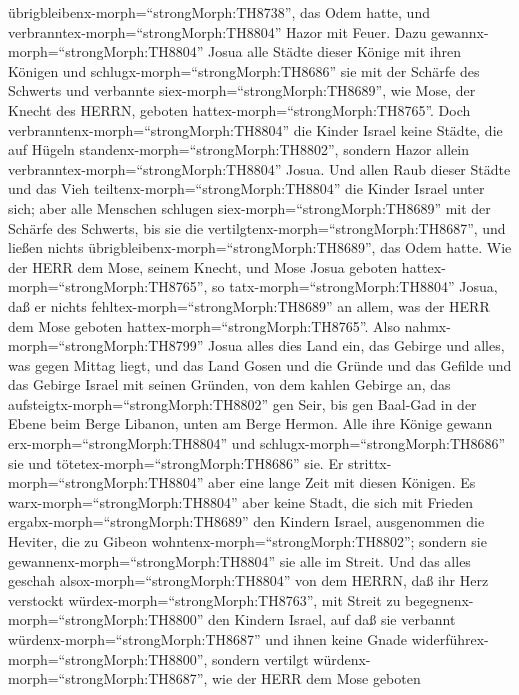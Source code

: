 übrigbleibenx-morph=``strongMorph:TH8738'', das Odem hatte, und
verbranntex-morph=``strongMorph:TH8804'' Hazor mit Feuer. 
Dazu gewannx-morph=``strongMorph:TH8804'' Josua alle Städte dieser
Könige mit ihren Königen und schlugx-morph=``strongMorph:TH8686'' sie
mit der Schärfe des Schwerts und verbannte
siex-morph=``strongMorph:TH8689'', wie Mose, der Knecht des HERRN,
geboten hattex-morph=``strongMorph:TH8765''.  Doch
verbranntenx-morph=``strongMorph:TH8804'' die Kinder Israel keine
Städte, die auf Hügeln standenx-morph=``strongMorph:TH8802'', sondern
Hazor allein verbranntex-morph=``strongMorph:TH8804'' Josua.
 Und allen Raub dieser Städte und das Vieh
teiltenx-morph=``strongMorph:TH8804'' die Kinder Israel unter sich; aber
alle Menschen schlugen siex-morph=``strongMorph:TH8689'' mit der Schärfe
des Schwerts, bis sie die vertilgtenx-morph=``strongMorph:TH8687'', und
ließen nichts übrigbleibenx-morph=``strongMorph:TH8689'', das Odem
hatte.  Wie der HERR dem Mose, seinem Knecht, und Mose
Josua geboten hattex-morph=``strongMorph:TH8765'', so
tatx-morph=``strongMorph:TH8804'' Josua, daß er nichts
fehltex-morph=``strongMorph:TH8689'' an allem, was der HERR dem Mose
geboten hattex-morph=``strongMorph:TH8765''.  Also
nahmx-morph=``strongMorph:TH8799'' Josua alles dies Land ein, das
Gebirge und alles, was gegen Mittag liegt, und das Land Gosen und die
Gründe und das Gefilde und das Gebirge Israel mit seinen Gründen,
 von dem kahlen Gebirge an, das
aufsteigtx-morph=``strongMorph:TH8802'' gen Seir, bis gen Baal-Gad in
der Ebene beim Berge Libanon, unten am Berge Hermon. Alle ihre Könige
gewann erx-morph=``strongMorph:TH8804'' und
schlugx-morph=``strongMorph:TH8686'' sie und
tötetex-morph=``strongMorph:TH8686'' sie.  Er
strittx-morph=``strongMorph:TH8804'' aber eine lange Zeit mit diesen
Königen.  Es warx-morph=``strongMorph:TH8804'' aber keine
Stadt, die sich mit Frieden ergabx-morph=``strongMorph:TH8689'' den
Kindern Israel, ausgenommen die Heviter, die zu Gibeon
wohntenx-morph=``strongMorph:TH8802''; sondern sie
gewannenx-morph=``strongMorph:TH8804'' sie alle im Streit. 
Und das alles geschah alsox-morph=``strongMorph:TH8804'' von dem HERRN,
daß ihr Herz verstockt würdex-morph=``strongMorph:TH8763'', mit Streit
zu begegnenx-morph=``strongMorph:TH8800'' den Kindern Israel, auf daß
sie verbannt würdenx-morph=``strongMorph:TH8687'' und ihnen keine Gnade
widerführex-morph=``strongMorph:TH8800'', sondern vertilgt
würdenx-morph=``strongMorph:TH8687'', wie der HERR dem Mose geboten
